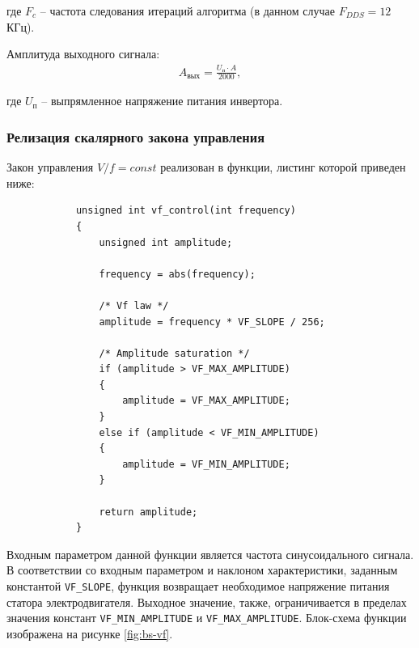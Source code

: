         где $F_c$ -- частота следования итераций алгоритма (в данном случае
        $F_{DDS} = 12$ КГц).

        Амплитуда выходного сигнала:
        \begin{gather*}
            A_\text{вых} = \frac{U_\text{п} \cdot A}{2000},
        \end{gather*}

        где $U_\text{п}$ -- выпрямленное напряжение питания инвертора. 

    \subsubsection{Релизация скалярного закона управления}
        Закон управления $V/f = const$ реализован в функции, листинг которой приведен ниже:
        \begin{verbatim}
            unsigned int vf_control(int frequency)
            {
                unsigned int amplitude;

                frequency = abs(frequency);

                /* Vf law */
                amplitude = frequency * VF_SLOPE / 256;

                /* Amplitude saturation */
                if (amplitude > VF_MAX_AMPLITUDE)
                {
                    amplitude = VF_MAX_AMPLITUDE;
                } 
                else if (amplitude < VF_MIN_AMPLITUDE)
                {
                    amplitude = VF_MIN_AMPLITUDE;
                }

                return amplitude;
            }
        \end{verbatim}
        
        Входным параметром данной функции является частота синусоидального
        сигнала. В соответствии со входным параметром и наклоном
        характеристики, заданным константой \verb"VF_SLOPE", функция возвращает
        необходимое напряжение питания статора электродвигателя. Выходное
        значение, также, ограничивается в пределах значения констант
        \verb"VF_MIN_AMPLITUDE" и \verb"VF_MAX_AMPLITUDE".
        Блок-схема функции изображена на рисунке \ref{fig:bs-vf}.

